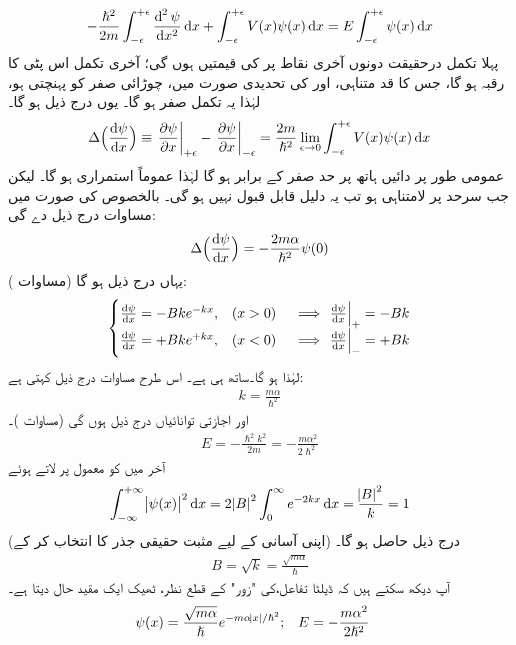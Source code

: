 \begin{align}
-\frac{\hslash^2}{2m}\int_{-\epsilon}^{+\epsilon}\frac{\dif^{\,2}\psi}{\dif x^2}\dif x+\int_{-\epsilon}^{+\epsilon}V(x)\psi(x)\dif x=E\int_{-\epsilon}^{+\epsilon}\psi(x)\dif x
\end{align}
پہلا تکمل درحقیقت دونوں آخری نقاط پر  کی قیمتیں ہوں گی؛ آخری تکمل اس پٹی کا رقبہ ہو گا، جس کا قد متناہی، اور  کی تحدیدی صورت میں، چوڑائی صفر کو پہنچتی ہو، لہٰذا یہ تکمل صفر ہو گا۔ یوں درج ذیل ہو گا۔
\begin{align}
\Delta\Big(\frac{\dif\psi}{\dif x}\Big)\equiv \left.\frac{\partial \psi}{\partial x}\right|_{+\epsilon}-\left.\frac{\partial \psi}{\partial x}\right|_{-\epsilon}=\frac{2m}{\hslash^2}\lim_{\epsilon\to0}\int_{-\epsilon}^{+\epsilon}V(x)\psi(x)\dif x
\end{align}
 عمومی طور پر دائیں ہاتھ پر حد صفر کے برابر ہو گا لہٰذا  عموماً استمراری ہو گا۔ لیکن جب سرحد پر  لامتناہی ہو تب یہ دلیل قابل قبول نہیں ہو گی۔ بالخصوص  کی صورت میں مساوات  درج ذیل دے گی: 
\begin{align}\label{مساوات_شروڈنگر_مبدا_پر_تفرقات_کا_فرق}
\Delta\Big(\frac{\dif \psi}{\dif x}\Big)=-\frac{2m\alpha}{\hslash^2}\psi(0)
\end{align}
یہاں درج ذیل ہو گا (مساوات ):
\begin{align*}
\begin{cases}
\frac{\dif \psi}{\dif x}=-Bke^{-kx},&(x>0)\quad \implies \left.\frac{\dif\psi}{\dif x}\right|_{+}=-Bk\\
\frac{\dif \psi}{\dif x}=+Bke^{+kx},&(x<0)\quad \implies \left.\frac{\dif\psi}{\dif x}\right|_{-}=+Bk
\end{cases}
\end{align*}
لہٰذا  ہو گا۔ساتھ ہی  ہے۔ اس طرح مساوات  درج ذیل کہتی ہے:
\begin{align}
k=\frac{m\alpha}{\hslash^2 }
\end{align}
اور اجازتی توانائیاں درج ذیل ہوں گی (مساوات )۔
\begin{align}
E=-\frac{\hslash^2 k^2}{2m}=-\frac{m\alpha^2}{2\hslash^2}
\end{align}
 آخر میں  کو معمول پر لاتے ہوئے 
\begin{align*}
\int_{-\infty}^{+\infty}\abs{\psi(x)}^2\dif x=2\abs{B}^2\int_0^{\infty}e^{-2kx}\dif x=\frac{\abs{B}^2}{k}=1
\end{align*}
 (اپنی آسانی کے لیے مثبت حقیقی جذر کا انتخاب کر کے) درج ذیل حاصل ہو گا۔
\begin{align}
B=\sqrt{k}=\frac{\sqrt{m\alpha}}{\hslash}
\end{align}
آپ دیکھ سکتے ہیں کہ ڈیلٹا تفاعل،کی "زور"  کے قطع نظر، ٹھیک ایک مقید حال دیتا ہے۔ 
\begin{align}\label{مساوات_شروڈنگر_مقید_حال_ڈیلٹا}
\psi(x)&=\frac{\sqrt{m\alpha}}{\hslash}e^{-m\alpha\abs{x}/\hslash^2};&&E=-\frac{m\alpha^2}{2\hslash^2}
\end{align}

